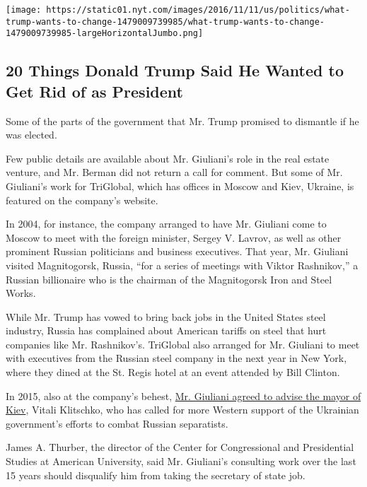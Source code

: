 \href{https://www.nytimes.com/interactive/2016/11/11/us/politics/what-trump-wants-to-change.html}{}

\texttt{[image: https://static01.nyt.com/images/2016/11/11/us/politics/what-trump-wants-to-change-1479009739985/what-trump-wants-to-change-1479009739985-largeHorizontalJumbo.png]}

\hypertarget{20-things-donald-trump-said-he-wanted-to-get-rid-of-as-president}{%
\subsection{20 Things Donald Trump Said He Wanted to Get Rid of as
President}\label{20-things-donald-trump-said-he-wanted-to-get-rid-of-as-president}}

Some of the parts of the government that Mr. Trump promised to dismantle
if he was elected.

Few public details are available about Mr. Giuliani's role in the real
estate venture, and Mr. Berman did not return a call for comment. But
some of Mr. Giuliani's work for TriGlobal, which has offices in Moscow
and Kiev, Ukraine, is featured on the company's website.

In 2004, for instance, the company arranged to have Mr. Giuliani come to
Moscow to meet with the foreign minister, Sergey V. Lavrov, as well as
other prominent Russian politicians and business executives. That year,
Mr. Giuliani visited Magnitogorsk, Russia, ``for a series of meetings
with Viktor Rashnikov,'' a Russian billionaire who is the chairman of
the Magnitogorsk Iron and Steel Works.

While Mr. Trump has vowed to bring back jobs in the United States steel
industry, Russia has complained about American tariffs on steel that
hurt companies like Mr. Rashnikov's. TriGlobal also arranged for Mr.
Giuliani to meet with executives from the Russian steel company in the
next year in New York, where they dined at the St. Regis hotel at an
event attended by Bill Clinton.

In 2015, also at the company's behest,
\href{http://www.tgsv.net/news/may-7-2008-\%E2\%80\%93-former-mayor-new-york-rudolph-giuliani-met-vitali-klitschko-nasdaq-studio-times-sq}{Mr.
Giuliani agreed to advise the mayor of Kiev}, Vitali Klitschko, who has
called for more Western support of the Ukrainian government's efforts to
combat Russian separatists.

James A. Thurber, the director of the Center for Congressional and
Presidential Studies at American University, said Mr. Giuliani's
consulting work over the last 15 years should disqualify him from taking
the secretary of state job.


